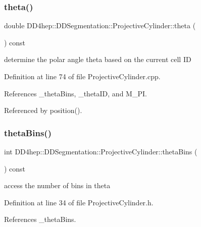 \subsubsection{\texorpdfstring{theta()}{theta()}\hspace{0.1cm}{\footnotesize\ttfamily [2/2]}}
{\footnotesize\ttfamily double D\+D4hep\+::\+D\+D\+Segmentation\+::\+Projective\+Cylinder\+::theta (\begin{DoxyParamCaption}{ }\end{DoxyParamCaption}) const\hspace{0.3cm}{\ttfamily [protected]}}



determine the polar angle theta based on the current cell ID 



Definition at line 74 of file Projective\+Cylinder.\+cpp.



References \+\_\+theta\+Bins, \+\_\+theta\+ID, and M\+\_\+\+PI.



Referenced by position().

\hypertarget{class_d_d4hep_1_1_d_d_segmentation_1_1_projective_cylinder_aee8027e1d9b736465333bfb7baaf8145}{}\label{class_d_d4hep_1_1_d_d_segmentation_1_1_projective_cylinder_aee8027e1d9b736465333bfb7baaf8145} 
\subsubsection{\texorpdfstring{theta\+Bins()}{thetaBins()}}
{\footnotesize\ttfamily int D\+D4hep\+::\+D\+D\+Segmentation\+::\+Projective\+Cylinder\+::theta\+Bins (\begin{DoxyParamCaption}{ }\end{DoxyParamCaption}) const\hspace{0.3cm}{\ttfamily [inline]}}



access the number of bins in theta 



Definition at line 34 of file Projective\+Cylinder.\+h.



References \+\_\+theta\+Bins.



